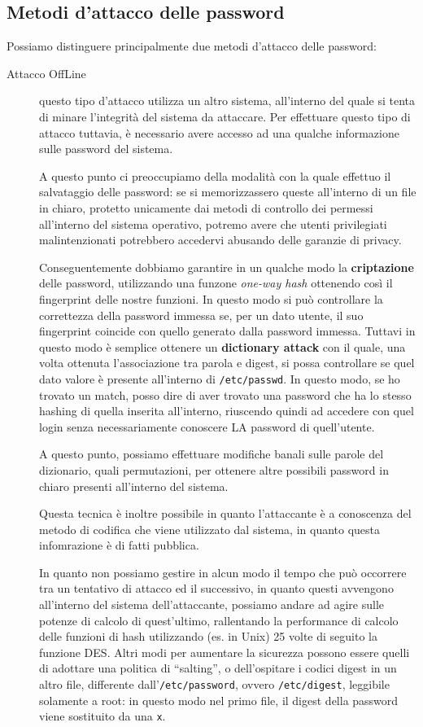 \subsection{Metodi d'attacco delle password}
Possiamo distinguere principalmente due metodi d'attacco delle password:
\begin{description}
\item[Attacco OffLine] questo tipo d'attacco utilizza un altro sistema, all'interno
	del quale si tenta di minare l'integrità del sistema da attaccare. Per 
	effettuare questo tipo di attacco tuttavia, è necessario avere accesso
	ad una qualche informazione sulle password del sistema.
	
	A questo punto ci preoccupiamo della modalità con la quale effettuo
	il salvataggio delle password: se si memorizzassero queste all'interno
	di un file in chiaro, protetto unicamente dai metodi di controllo
	dei permessi all'interno del sistema operativo, potremo avere che 
	utenti privilegiati malintenzionati potrebbero accedervi abusando 
	delle garanzie di privacy. 
	
	Conseguentemente dobbiamo garantire in un qualche modo la \textbf{criptazione}
	delle password, utilizzando una funzone \textit{one-way hash} ottenendo
	così il fingerprint delle nostre funzioni. In questo modo si può 
	controllare la correttezza della password immessa se, per un dato utente,
	il suo fingerprint coincide con quello generato dalla password immessa.
	Tuttavi in questo modo è semplice ottenere un \textbf{dictionary attack} 
	con il quale, una volta ottenuta l'associazione tra parola e digest,
	si possa controllare se quel dato valore è presente all'interno
	di \texttt{/etc/passwd}. In questo modo, se ho trovato un match, posso
	dire di aver trovato una password che ha lo stesso hashing di quella
	inserita all'interno, riuscendo quindi ad accedere con quel login senza
	necessariamente conoscere LA password di quell'utente.
	
	A questo punto, possiamo effettuare modifiche banali sulle parole del
	dizionario, quali permutazioni, per ottenere altre possibili password
	in chiaro presenti all'interno del sistema.
	
	Questa tecnica è inoltre possibile in quanto l'attaccante è a conoscenza
	del metodo di codifica che viene utilizzato dal sistema, in quanto questa
	infomrazione è di fatti pubblica.
	
	In quanto non possiamo gestire in alcun modo il tempo che può occorrere
	tra un tentativo di attacco ed il successivo, in quanto questi avvengono
	all'interno del sistema dell'attaccante, possiamo andare ad agire sulle
	potenze di calcolo di quest'ultimo, rallentando la performance di calcolo
	delle funzioni di hash utilizzando (es. in Unix) 25 volte di seguito la 
	funzione DES. Altri modi per aumentare la sicurezza possono essere
	quelli di adottare una politica di ``salting'', o dell'ospitare i 
	codici digest in un altro file, differente dall'\texttt{/etc/password}, ovvero
	\texttt{/etc/digest}, leggibile solamente a root: in questo modo nel primo
	file, il digest della password viene sostituito da una \texttt x.
	

\end{description}
